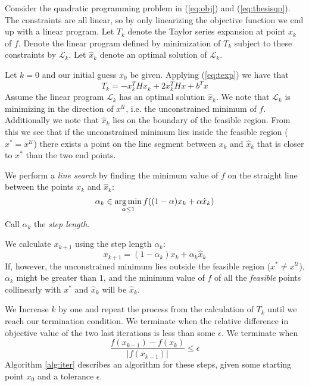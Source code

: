 Consider the quadratic programming problem in (\ref{eq:obj}) and
(\ref{eq:thesisqp}).
The constraints are all linear, so by only linearizing the objective function
we end up with a linear program.
Let $T_k$ denote the Taylor series expansion at point $x_k$ of $f$.
Denote the linear program defined by minimization of $T_k$ subject to these
constraints by $\mathcal{L}_k$.
Let $\hat{x}_k$ denote an optimal solution of $\mathcal{L}_k$.

Let $k = 0$ and our initial guess $x_0$ be given.
Applying (\ref{eq:texp}) we have that
\[
T_k = - x_k^THx_k + 2x_k^THx + b^Tx
\]
Assume the linear program $\mathcal{L}_k$ has an optimal solution $\hat{x}_k$.
We note that $\mathcal{L}_k$ is minimizing in the direction of
$x^{\mathcal{U}}$, i.e. the unconstrained minimum of $f$.
Additionally we note that $\hat{x}_k$ lies on the boundary of the feasible
region.
From this we see that if the unconstrained minimum lies inside the feasible
region ($x^* = x^\mathcal{U}$) there exists a point on the line segment between
$x_k$ and $\hat{x}_k$ that is closer to $x^*$ than the two end points.

We perform a \emph{line search} by finding the minimum value of $f$ on the
straight line between the points $x_k$ and $\hat{x}_k$:
\[
\alpha_k \in \operatorname*{arg\,min}_{\alpha \leq 1} f((1-\alpha) x_k + \alpha \hat{x}_k)
\]
Call $\alpha_k$ the \emph{step length}.

We calculate $x_{k+1}$ using the step length $\alpha_k$:
\[
x_{k+1} = (1-\alpha_k) x_k + \alpha_k\hat{x}_k
\]
If, however, the unconstrained minimum lies outside the feasible region
($x^* \neq x^\mathcal{U}$), $\alpha_k$ might be greater than $1$, and the
minimum value of $f$ of all the \emph{feasible} points collinearly with $x^*$
and $\hat{x}_k$ will be $\hat{x}_k$.

We Increase $k$ by one and repeat the process from the calculation of $T_k$
until we reach our termination condition.
We terminate when the relative difference in objective value of the two last
iterations is less than some $\epsilon$. We terminate when
\[
\frac{f(x_{k-1}) - f(x_k)}{|f(x_{k-1})|} \leq \epsilon
\]
Algorithm \ref{alg:iter} describes an algorithm for these steps, given some
starting point $x_0$ and a tolerance $\epsilon$.


